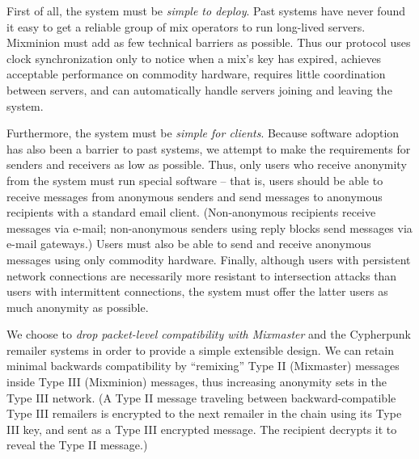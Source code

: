 \documentclass[final]{ieee}
\begin{document}

First of all, the system must be \emph{simple to deploy}. 
Past systems have never found it easy to get a reliable group of mix
operators to run long-lived servers. Mixminion must add as few
technical barriers as possible.  Thus our protocol uses clock
synchronization only to notice when a mix's key has expired, achieves
acceptable performance on commodity hardware, requires little
coordination between servers, and can automatically handle servers
joining and leaving the system.

Furthermore, the system must be \emph{simple for clients}.
Because software adoption has also been a barrier to past
systems, we attempt to make the requirements for senders and receivers as low
as possible. Thus, only users who receive anonymity from the system must run
special software -- that is, users should be able to receive messages
from anonymous senders and send messages to anonymous recipients with a
standard email client.  (Non-anonymous recipients receive messages via
e-mail; non-anonymous senders using reply blocks send messages via e-mail gateways.)
Users must also be able to send and receive anonymous messages
using only commodity hardware. Finally, although users with persistent
network connections are necessarily more resistant to intersection
attacks than users with intermittent connections, the system must offer
the latter users as much anonymity as possible.


We choose to \emph{drop packet-level compatibility with Mixmaster} and the
Cypherpunk remailer systems in order to provide a simple extensible
design. We can retain minimal backwards compatibility by ``remixing'' Type II
(Mixmaster) messages inside Type III (Mixminion) messages, thus increasing
anonymity sets in the Type III network. (A Type II message traveling between
backward-compatible Type III remailers is encrypted to
the next remailer in the chain using its Type III key, and sent as a Type III
encrypted message.  The recipient decrypts it to reveal the Type II
message.)
\end{document}

